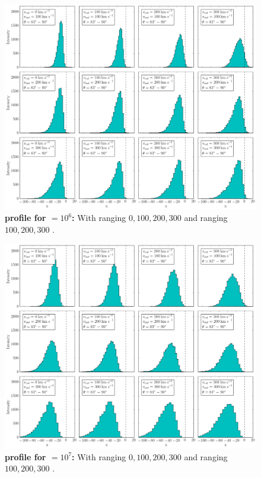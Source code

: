 \newpage

\begin{figure}[h!]
	\begin{center}
		\includegraphics[width=1\textwidth]{./figures/chapter3/1_tau10E6_phi83-90}
	\end{center}
	\caption{\textbf{\lya profile for \tauh$=10^6$:} With \vrot ranging $0,100,200,300$ \kms and \vout ranging $100,200,300$ \kms.
		\label{fig:1_tau10E6_phi83-90}}
\end{figure}

\newpage

\begin{figure}[h!]
	\begin{center}
		\includegraphics[width=1\textwidth]{./figures/chapter3/1_tau10E7_phi83-90}
	\end{center}
	\caption{\textbf{\lya profile for \tauh$=10^7$:} With \vrot ranging $0,100,200,300$ \kms and \vout ranging $100,200,300$ \kms.
		\label{fig:1_tau10E7_phi83-90}}
\end{figure}

